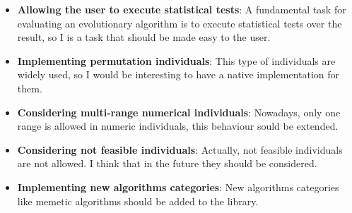 \begin{itemize}
    \item \textbf{Allowing the user to execute statistical tests}: A fundamental task for evaluating an evolutionary algorithm is to execute statistical tests over the result, so I is a task that should be made easy to the user.
    \item \textbf{Implementing permutation individuals}: This type of individuals are widely used, so I would be interesting to have a native implementation for them.
    \item \textbf{Considering multi-range numerical individuals}: Nowadays, only one range is allowed in numeric individuals, this behaviour sould be extended.
    \item \textbf{Considering not feasible individuals}: Actually, not feasible individuals are not allowed. I think that in the future they should be considered.
    \item \textbf{Implementing new algorithms categories}: New algorithms categories like memetic algorithms should be added to the library.
\end{itemize}
